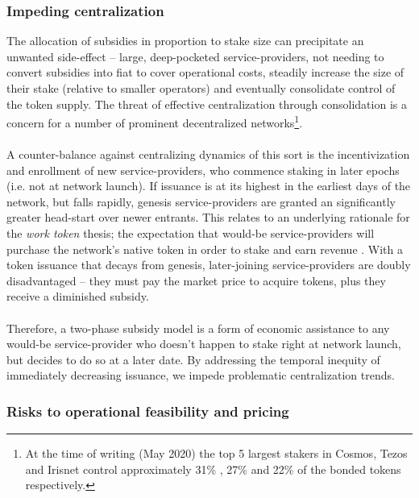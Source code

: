 \documentclass[longbibliography,nofootinbib]{revtex4-1}
\begin{document}
\subsubsection{Impeding centralization}

The allocation of subsidies in proportion to stake size can precipitate an unwanted side-effect – large, deep-pocketed service-providers, not needing to convert subsidies into fiat to cover operational costs, steadily increase the size of their stake (relative to smaller operators) and eventually consolidate control of the token supply. The threat of effective centralization through consolidation is a concern for a number of prominent decentralized networks\footnote{At the time of writing (May 2020) the top 5 largest stakers in Cosmos, Tezos and Irisnet control approximately 31\% \cite{cosmos}, 27\% \cite{tezos} and 22\% \cite{irisnet} of the bonded tokens respectively.}. 
\\\\
A counter-balance against centralizing dynamics of this sort is the incentivization and enrollment of new service-providers, who commence staking in later epochs (i.e. not at network launch). If issuance is at its highest in the earliest days of the network, but falls rapidly, genesis service-providers are granted an significantly greater head-start over newer entrants. This relates to an underlying rationale for the \textit{work token} thesis; the expectation that would-be service-providers will purchase the network's native token in order to stake and earn revenue \cite{work-token}. With a token issuance that decays from genesis, later-joining service-providers are doubly disadvantaged – they must pay the market price to acquire tokens, plus they receive a diminished subsidy. 
\\\\
Therefore, a two-phase subsidy model is a form of economic assistance to any would-be service-provider who doesn't happen to stake right at network launch, but decides to do so at a later date. By addressing the temporal inequity of immediately decreasing issuance, we impede problematic centralization trends.

\subsubsection{Risks to operational feasibility and pricing}
\end{document}
